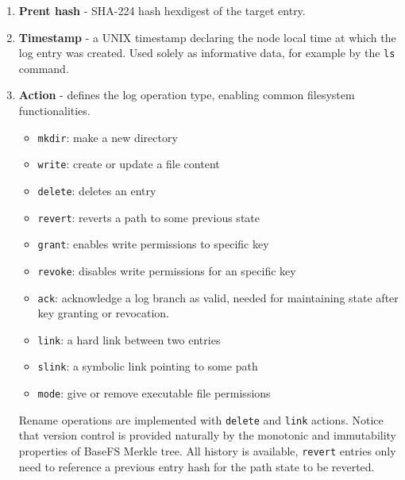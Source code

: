 \documentclass{sig-alternate}
\begin{document}
\begin{enumerate}
\item \textbf{Prent hash} - SHA-224 hash hexdigest of the target entry.
\item \textbf{Timestamp} - a UNIX timestamp declaring the node local time at which the log entry was created. Used solely as informative data, for example by the \texttt{ls} command.
\item \textbf{Action} - defines the log operation type, enabling common filesystem functionalities.
    \begin{itemize}
    \item \texttt{mkdir}: make a new directory
    \item \texttt{write}: create or update a file content
    \item \texttt{delete}: deletes an entry
    \item \texttt{revert}: reverts a path to some previous state
    \item \texttt{grant}: enables write permissions to specific key
    \item \texttt{revoke}: disables write permissions for an specific key
    \item \texttt{ack}: acknowledge a log branch as valid, needed for maintaining state after key granting or revocation.
    \item \texttt{link}: a hard link between two entries
    \item \texttt{slink}: a symbolic link pointing to some path
    \item \texttt{mode}: give or remove executable file permissions
    \end{itemize}

Rename operations are implemented with \texttt{delete} and \texttt{link} actions. Notice that version control is provided naturally by the monotonic and immutability properties of BaseFS Merkle tree. All history is available, \texttt{revert} entries only need to reference a previous entry hash for the path state to be reverted.


\end{enumerate}
\end{document}
